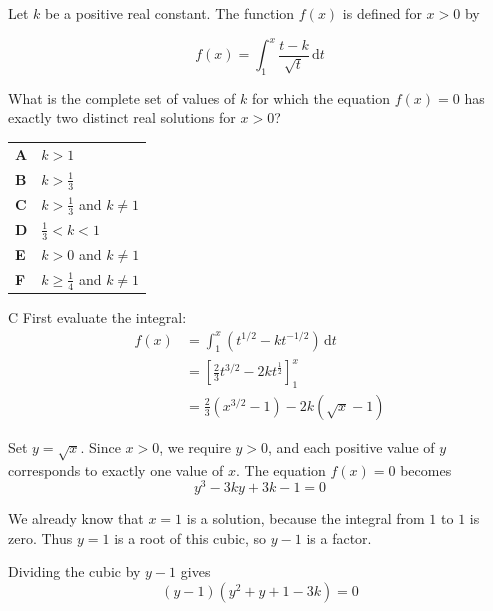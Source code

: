 \documentclass[11pt,a4paper]{article}
\begin{document}
\begin{enumerate}[label=\textbf{\arabic*.},leftmargin=*,itemsep=0pt,start=6]
\questionitem[Integration]
Let $k$ be a positive real constant. The function $f(x)$ is defined for $x > 0$ by

\[ f(x) = \int_1^x \frac{t - k}{\sqrt{t}} \, \mathrm{d}t \]

What is the complete set of values of $k$ for which the equation $f(x) = 0$ has exactly two distinct real solutions for $x > 0$?

\par\vspace*{12pt}
\begin{tabularx}{\linewidth}{@{}>{\bfseries}l Y@{}}
A &
$k > 1$
\\[0.8em]
B &
$k > \frac{1}{3}$
\\[0.8em]
C &
$k > \frac{1}{3}$ and $k \neq 1$
\\[0.8em]
D &
$\frac{1}{3} < k < 1$
\\[0.8em]
E &
$k > 0$ and $k \neq 1$
\\[0.8em]
F &
$k \ge \frac{1}{4}$ and $k \neq 1$
\\
\end{tabularx}

\begin{djsSolution}{C}
First evaluate the integral:
\[
\begin{aligned}
f(x)
&=\int_1^x\left(t^{1/2}-kt^{-1/2}\right)\,\mathrm{d}t\\[8pt]
&=\left[\frac{2}{3}t^{3/2}-2kt^\frac{1}{2}\right] _1^x\\[8pt]
&=\frac{2}{3}(x^{3/2}-1)-2k(\sqrt x-1)
\end{aligned}
\]

Set $y=\sqrt x$. Since $x>0$, we require $y>0$, and each positive value of $y$ corresponds to exactly one value of $x$. The equation $f(x)=0$ becomes
\[
y^3-3ky+3k-1=0
\]

We already know that $x=1$ is a solution, because the integral from $1$ to $1$ is zero. Thus $y=1$ is a root of this cubic, so $y-1$ is a factor.

Dividing the cubic by $y-1$ gives
\[
(y-1)(y^2+y+1-3k)=0
\]


\end{djsSolution}
\end{enumerate}
\end{document}
